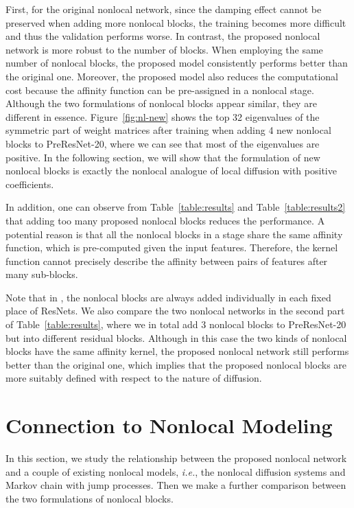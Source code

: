 \documentclass{article}
\begin{document}
First, for the original nonlocal network, since the damping effect cannot be preserved when adding more nonlocal blocks, the training becomes more difficult and thus the validation performs worse. In contrast, the proposed nonlocal network is more robust to the number of blocks. When employing the same number of nonlocal blocks, the proposed model consistently performs better than the original one. Moreover, the proposed model also reduces the computational cost because the affinity function can be pre-assigned in a nonlocal stage. Although the two formulations of nonlocal blocks appear similar, they are different in essence. Figure~\ref{fig:nl-new}  shows the top 32 eigenvalues of the symmetric part of weight matrices after training when adding 4 new nonlocal blocks to PreResNet-20, where we can see that most of the eigenvalues are positive. In the following section, we will show that the formulation of new nonlocal blocks is exactly the nonlocal analogue of local diffusion with positive coefficients. %

In addition, one can observe from Table~\ref{table:results} and Table~\ref{table:results2} that adding too many proposed nonlocal blocks reduces the performance. A potential reason is that all the nonlocal blocks in a stage share the same affinity function, which is pre-computed given the input features. Therefore, the kernel function cannot precisely describe the affinity between pairs of features after many sub-blocks. 

Note that in \cite{wang2017non}, the nonlocal blocks are always added individually in each fixed place of ResNets. We also compare the two nonlocal networks in the second part of Table~\ref{table:results}, where we in total add 3 nonlocal blocks to PreResNet-20 but into different residual blocks. Although in this case the two kinds of nonlocal blocks have the  same affinity kernel, the proposed nonlocal network still performs better than the original one, which implies that the proposed nonlocal blocks are more suitably defined with respect to the nature of diffusion.


\section{Connection to Nonlocal Modeling}\label{sec:relation}
In this section, we study the relationship between the proposed nonlocal network and a couple of existing nonlocal models, {\em i.e.}, the nonlocal diffusion systems and Markov chain with jump processes. Then we make a further comparison between the two formulations of nonlocal blocks.
\end{document}
